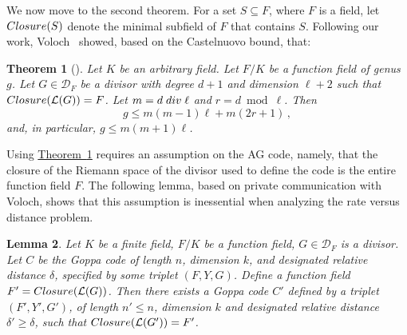 \documentclass[10pt]{article}
\newtheorem{theorem}{Theorem}[section]
\newtheorem{lemma}[theorem]{Lemma}
\theoremstyle{definition}
\numberwithin{equation}{section}
\newcommand{\expref}[2]{\texorpdfstring{\hyperref[#2]{#1~\ref{#2}}}{#1~\ref{#2}}}
\newcommand{\cD}{\mathcal{D}}
\newcommand{\cL}{\mathcal{L}}
\renewcommand{\div}{{\rm div}}
\newcommand{\closure}{{\rm Closure}}
\begin{document}
We now move to the second theorem. For a set $S \subseteq F$, where
$F$ is a field, let $\closure(S)$ denote the minimal subfield of $F$
that contains $S$. Following our work, Voloch~\cite{V:09} showed,
based on the Castelnuovo bound, that:
\begin{theorem}[{\cite[based on the Castelnuovo bound]{V:09}}]
\label{thm:castel} Let $K$ be an arbitrary field. Let $F/K$ be a
function field of genus $g$. Let $G \in\cD_F$ be a divisor with
degree $d+1$ and dimension $\ell+2$ such that
$\closure(\cL(G))=F$. Let $m = d \;\div\; \ell$ and $r = d \bmod
\ell$. Then $$g \le m(m-1)\ell + m(2r+1)\,,$$ and, in particular, $g
\le m(m+1)\ell$.
\end{theorem}

Using \expref{Theorem}{thm:castel} requires an assumption on the AG
code, namely, that the closure of the Riemann space of the divisor
used to define the code is the entire function field $F$. The
following lemma, based on private communication with Voloch, shows
that this assumption is inessential when analyzing the rate versus
distance problem.
\begin{lemma}
\label{lem:closure-assumption} Let $K$ be a finite field, $F/K$ be a
function field, $G \in\cD_F$ is a divisor. Let $C$ be the Goppa code
of length $n$, dimension $k$, and designated relative distance
$\delta$, specified by some triplet $(F,Y,G)$. Define a function
field $F' = \closure(\cL(G))$. Then there exists a Goppa code $C'$
defined by a triplet $(F',Y',G')$, of length $n' \le n$, dimension
$k$ and designated relative distance $\delta' \ge \delta$, such that
$\closure(\cL(G'))=F'$.
\end{lemma}
\end{document}
